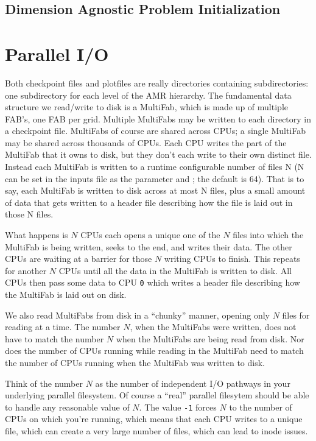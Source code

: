 \subsection{Dimension Agnostic Problem Initialization}


\section{Parallel I/O}

Both checkpoint files and plotfiles are really directories containing
subdirectories: one subdirectory for each level of the AMR hierarchy.
The fundamental data structure we read/write to disk is a MultiFab,
which is made up of multiple FAB's, one FAB per grid.  Multiple
MultiFabs may be written to each directory in a checkpoint file.
MultiFabs of course are shared across CPUs; a single MultiFab may be
shared across thousands of CPUs.  Each CPU writes the part of the
MultiFab that it owns to disk, but they don't each write to their own
distinct file.  Instead each MultiFab is written to a runtime
configurable number of files N (N can be set in the inputs file as the
parameter  and ; the
default is 64).  That is to say, each MultiFab is written to disk
across at most N files, plus a small amount of data that gets written
to a header file describing how the file is laid out in those N files.

What happens is $N$ CPUs each opens a unique one of the $N$ files into
which the MultiFab is being written, seeks to the end, and writes
their data.  The other CPUs are waiting at a barrier for those $N$
writing CPUs to finish.  This repeats for another $N$ CPUs until all the
data in the MultiFab is written to disk.  All CPUs then pass some data
to CPU {\tt 0} which writes a header file describing how the MultiFab is
laid out on disk.

We also read MultiFabs from disk in a ``chunky'' manner, opening only $N$
files for reading at a time.  The number $N$, when the MultiFabs were
written, does not have to match the number $N$ when the MultiFabs are
being read from disk.  Nor does the number of CPUs running while
reading in the MultiFab need to match the number of CPUs running when
the MultiFab was written to disk.

Think of the number $N$ as the number of independent I/O pathways in
your underlying parallel filesystem.  Of course a ``real'' parallel
filesytem should be able to handle any reasonable value of $N$.  The
value {\tt -1} forces $N$ to the number of CPUs on which you're
running, which means that each CPU writes to a unique file, which can
create a very large number of files, which can lead to inode issues.
